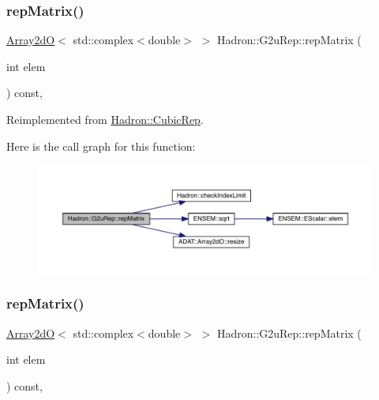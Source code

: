 \subsubsection{\texorpdfstring{repMatrix()}{repMatrix()}\hspace{0.1cm}{\footnotesize\ttfamily [2/3]}}
{\footnotesize\ttfamily \mbox{\hyperlink{classADAT_1_1Array2dO}{Array2dO}}$<$ std\+::complex$<$double$>$ $>$ Hadron\+::\+G2u\+Rep\+::rep\+Matrix (\begin{DoxyParamCaption}\item[{int}]{elem }\end{DoxyParamCaption}) const\hspace{0.3cm}{\ttfamily [inline]}, {\ttfamily [virtual]}}



Reimplemented from \mbox{\hyperlink{structHadron_1_1CubicRep_ac5d7e9e6f4ab1158b5fce3e4ad9e8005}{Hadron\+::\+Cubic\+Rep}}.

Here is the call graph for this function\+:
\nopagebreak
\begin{figure}[H]
\begin{center}
\leavevmode
\includegraphics[width=350pt]{dc/dc0/structHadron_1_1G2uRep_ac35dd43af2c4b6f32d9d3511b2500230_cgraph}
\end{center}
\end{figure}
\mbox{\label{structHadron_1_1G2uRep_ac35dd43af2c4b6f32d9d3511b2500230}} 
\subsubsection{\texorpdfstring{repMatrix()}{repMatrix()}\hspace{0.1cm}{\footnotesize\ttfamily [3/3]}}
{\footnotesize\ttfamily \mbox{\hyperlink{classADAT_1_1Array2dO}{Array2dO}}$<$ std\+::complex$<$double$>$ $>$ Hadron\+::\+G2u\+Rep\+::rep\+Matrix (\begin{DoxyParamCaption}\item[{int}]{elem }\end{DoxyParamCaption}) const\hspace{0.3cm}{\ttfamily [inline]}, {\ttfamily [virtual]}}



